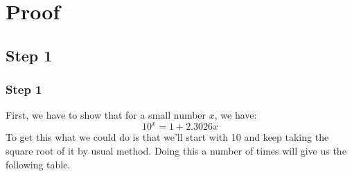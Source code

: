 \documentclass{beamer}
\begin{document}
\section{Proof}
\subsection{Step 1}
\begin{frame}
    \frametitle{Step 1}
    First, we have to show that for a small number $x$, we have:
    \begin{equation}
        \label{eq:2}
        10^x = 1 + 2.3026x
    \end{equation}
    To get this what we could do is that we'll start with 10 and keep taking the square root of it by usual method. Doing this a number of times will give us the following table.
\end{frame}
\end{document}
